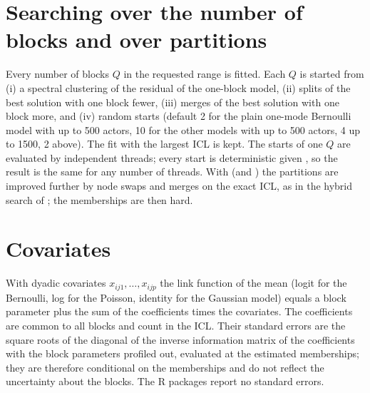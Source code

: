 \section{Searching over the number of blocks and over partitions}
Every number of blocks $Q$ in the requested range is fitted. Each $Q$ is started from (i) a spectral clustering of the residual of the one-block model, (ii) splits of the best solution with one block fewer, (iii) merges of the best solution with one block more, and (iv)  random starts (default 2 for the plain one-mode Bernoulli model with up to 500 actors, 10 for the other models with up to 500 actors, 4 up to 1500, 2 above). The fit with the largest ICL is kept. The starts of one $Q$ are evaluated by independent threads; every start is deterministic given , so the result is the same for any number of threads. With  (and ) the partitions are improved further by node swaps and merges on the exact ICL, as in the hybrid search of \greed{}; the memberships are then hard.

\section{Covariates}
With dyadic covariates $x_{ij1},\dots,x_{ijp}$ the link function of the mean (logit for the Bernoulli, log for the Poisson, identity for the Gaussian model) equals a block parameter plus the sum of the coefficients times the covariates. The coefficients are common to all blocks and count in the ICL. Their standard errors are the square roots of the diagonal of the inverse information matrix of the coefficients with the block parameters profiled out, evaluated at the estimated memberships; they are therefore conditional on the memberships and do not reflect the uncertainty about the blocks. The R packages report no standard errors.


